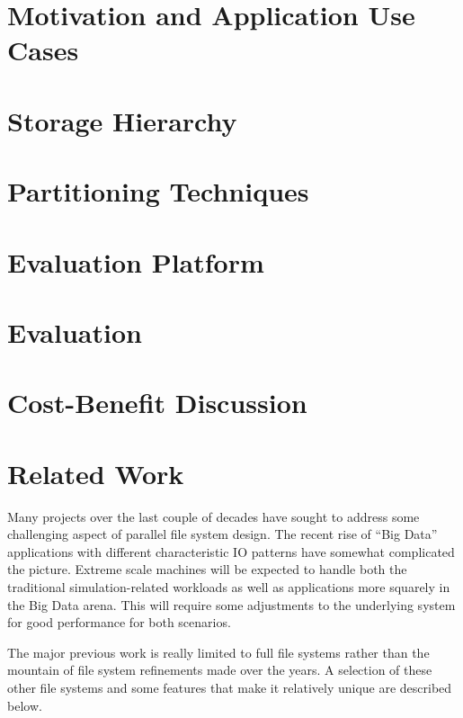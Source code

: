 \documentclass{sig-alt-gov2}
\begin{document}
\section{Motivation and Application Use Cases}
\label{motivation}

\section{Storage Hierarchy}
\label{storage-h}

\section{Partitioning Techniques}
\label{details}

\section{Evaluation Platform}
\label{hardware}

\section{Evaluation}
\label{performance}

\section{Cost-Benefit Discussion}
\label{discussion}


\section{Related Work}
\label{related-work}

Many projects over the last couple of decades have sought to address some
challenging aspect of parallel file system design. The recent rise of ``Big
Data'' applications with different characteristic IO patterns have somewhat
complicated the picture. Extreme scale machines will be expected to handle both
the traditional simulation-related workloads as well as applications more
squarely in the Big Data arena. This will require some adjustments to the
underlying system for good performance for both scenarios.

The major previous work is really limited to full file systems rather than the
mountain of file system refinements made over the years. A selection of these
other file systems and some features that make it relatively unique are
described below.
\end{document}

